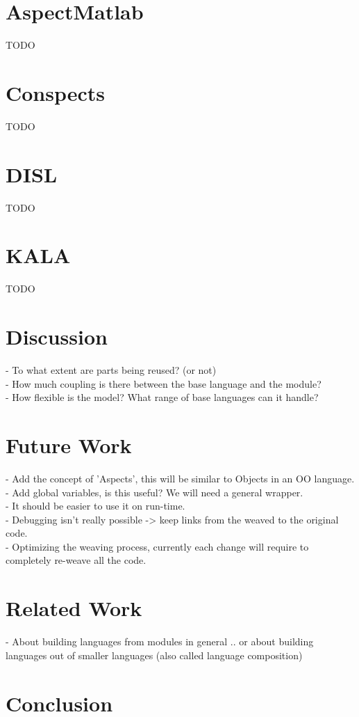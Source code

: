 \documentclass[a4paper]{report}
\begin{document}
\chapter{AspectMatlab}
TODO

\chapter{Conspects}
TODO

\chapter{DISL}
TODO

\chapter{KALA}
TODO


\chapter{Discussion}
- To what extent are parts being reused? (or not)\\
- How much coupling is there between the base language and the module?\\
- How flexible is the model? What range of base languages can it handle?
\chapter{Future Work}
- Add the concept of 'Aspects', this will be similar to Objects in an OO language.\\
- Add global variables, is this useful? We will need a general wrapper.\\
- It should be easier to use it on run-time.\\
- Debugging isn't really possible -> keep links from the weaved to the original code.\\
- Optimizing the weaving process, currently each change will require to completely re-weave all the code.\\
\chapter{Related Work}
- About building languages from modules in general .. or about building languages out of smaller languages (also called language composition)
\chapter{Conclusion}
\end{document}
